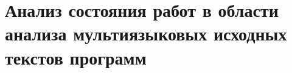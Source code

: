 \section{Анализ состояния работ в области анализа мультиязыковых исходных текстов программ}


\clearpage